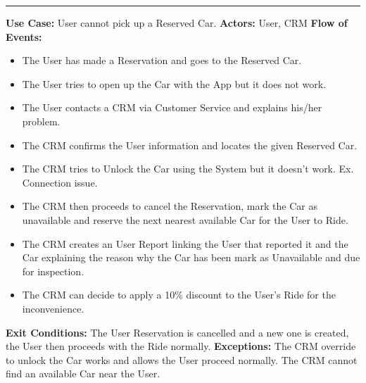 \documentclass[a4paper]{article}
\begin{document}
\begin{center}
\rule{8cm}{0.4pt}
\end{center}
\textbf{Use Case:} User cannot pick up a Reserved Car.
\newline
\textbf{Actors:} User, CRM
\newline
\textbf{Flow of Events:}
\begin{itemize}
\item The User has made a Reservation and goes to the Reserved Car.
\item The User tries to open up the Car with the App but it does not work.
\item The User contacts a CRM via Customer Service and explains his/her problem.
\item The CRM confirms the User information and locates the given Reserved Car.
\item The CRM tries to Unlock the Car using the System but it doesn't work. Ex. Connection issue.
\item The CRM then proceeds to cancel the Reservation, mark the Car as unavailable and reserve the next nearest available Car for the User to Ride.
\item The CRM creates an User Report linking the User that reported it and the Car explaining the reason why the Car has been mark as Unavailable and due for inspection.
\item The CRM can decide to apply a 10\% discount to the User's Ride for the inconvenience.
\end{itemize}
\textbf{Exit Conditions:} The User Reservation is cancelled and a new one is created, the User then proceeds with the Ride normally.
\newline
\textbf{Exceptions:} The CRM override to unlock the Car works and allows the User proceed normally. The CRM cannot find an available Car near the User.
\newline
\end{document}
